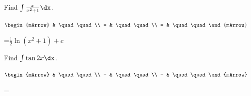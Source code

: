 \begin{mtask}[resume] 
		 
   \task \begin{exercise} Find $\int \frac{x}{x^2+1} \dx$.
           \begin{envSolution}
             $\begin{mArrow}
                   & \quad \quad              \\
		   		 = & \quad \quad              \\
				 = & \quad \quad 
              \end{mArrow}$
            \begin{shortsolution}  
			     =$ \frac{1}{2}\ln{(x^2+1)} + c $
			\end{shortsolution}				 
           \end{envSolution}
         \end{exercise}
		 
   \task \begin{exercise} Find $\int \tan{2x} \dx$.
           \begin{envSolution}
             $\begin{mArrow}
                   & \quad \quad              \\
		   		 = & \quad \quad              \\
				 = & \quad \quad 
              \end{mArrow}$
            \begin{shortsolution}  
			     =$ \quad \quad \quad \quad$
			\end{shortsolution}				 
           \end{envSolution}
         \end{exercise}
	\end{mtask}




